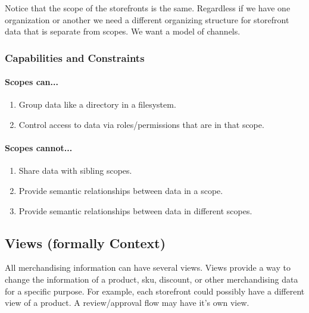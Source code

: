 \documentclass[11pt]{article}
\begin{document}
Notice that the scope of the storefronts is the same. Regardless if we have one
organization or another we need a different organizing structure for storefront
data that is separate from scopes. We want a model of channels.

\subsubsection{Capabilities and Constraints}

\paragraph{Scopes can...}

\begin{enumerate}
    \item Group data like a directory in a filesystem.
    \item Control access to data via roles/permissions that are in that scope.
\end{enumerate}

\paragraph{Scopes cannot...}

\begin{enumerate}
    \item Share data with sibling scopes.
    \item Provide semantic relationships between data in a scope.
    \item Provide semantic relationships between data in different scopes.
\end{enumerate}

\subsection{Views (formally Context)}

All merchandising information can have several views. Views provide a way to change the 
information of a product, sku, discount, or other merchandising data for a specific
purpose. For example, each storefront could possibly have a different view of a product.
A review/approval flow may have it's own view.

\end{document}
